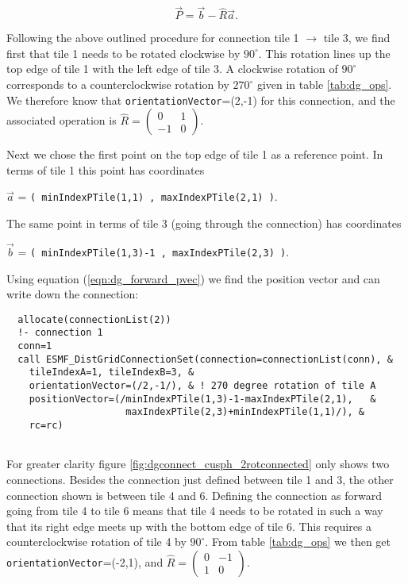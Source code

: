    \begin{equation}
   \label{eqn:dg_forward_pvec}
   \vec P = \vec b - \hat R \vec a.
   \end{equation}
  
   Following the above outlined procedure for connection tile 1 $\rightarrow$
   tile 3, we find first that tile 1 needs to be rotated clockwise by $90^\circ$.
   This rotation lines up the top edge of tile 1 with the left edge of
   tile 3. A clockwise rotation of $90^\circ$ corresponds to a counterclockwise
   rotation by $270^\circ$ given in table \ref{tab:dg_ops}. We therefore know
   that {\tt orientationVector}=(2,-1) for this connection, and the associated
   operation is $\hat R=\left(\begin{array}{rr}
      0 & 1 \\
      -1 & 0 \end{array} \right)$.
  
   Next we chose the first point on the top edge of tile 1 as a reference point.
   In terms of tile 1 this point has coordinates
  
   $\vec a$ = {\tt ( minIndexPTile(1,1) , maxIndexPTile(2,1) )}.
  
   The same point in terms of tile 3 (going through the connection) has 
   coordinates
  
   $\vec b$ = {\tt ( minIndexPTile(1,3)-1 , maxIndexPTile(2,3) )}.
  
   Using equation (\ref{eqn:dg_forward_pvec}) we find the position vector and
   can write down the connection: 

 \begin{verbatim}
  allocate(connectionList(2))
  !- connection 1
  conn=1
  call ESMF_DistGridConnectionSet(connection=connectionList(conn), &
    tileIndexA=1, tileIndexB=3, &
    orientationVector=(/2,-1/), & ! 270 degree rotation of tile A
    positionVector=(/minIndexPTile(1,3)-1-maxIndexPTile(2,1),   &
                     maxIndexPTile(2,3)+minIndexPTile(1,1)/), &
    rc=rc)
 
\end{verbatim}
 

   For greater clarity figure \ref{fig:dgconnect_cusph_2rotconnected} only
   shows two connections. Besides the connection just defined between tile 1 
   and 3, the other connection shown is between tile 4 and 6. Defining the
   connection as forward going from tile 4 to tile 6 means that tile 4 needs
   to be rotated in such a way that its right edge meets up with the bottom
   edge of tile 6. This requires a counterclockwise rotation of tile 4 by
   $90^\circ$. From table \ref{tab:dg_ops} we then get 
   {\tt orientationVector}=(-2,1), and $\hat R=\left(\begin{array}{rr}
      0 & -1 \\
      1 & 0 \end{array} \right)$.
  
